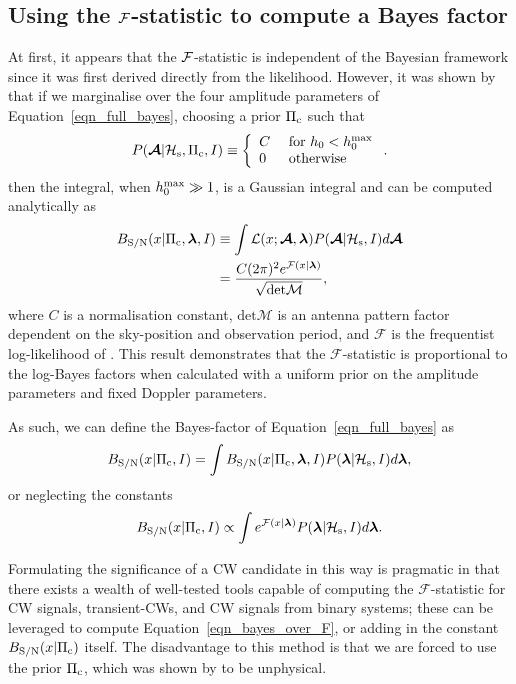\documentclass[aps, prd, twocolumn, superscriptaddress, floatfix, showpacs, nofootinbib, longbibliography]{revtex4-1}
\begin{document}
\subsection{Using the ${\mathcal{F}}$-statistic to compute a Bayes factor} At first, it
appears that the ${\mathcal{F}}$-statistic is independent of the Bayesian framework since
it was first derived directly from the likelihood. However, it was shown by
\citet{prix2009} that if we marginalise over the four amplitude parameters of
Equation~\eqref{eqn_full_bayes}, choosing a prior $\Pi_{\rm c}$ such that
\begin{equation}
P(\boldsymbol{\mathcal{A}}| \mathcal{H}_{\rm s}, \Pi_{\rm c}, I) \equiv \left\{
\begin{array}{ll}
C & \textrm{ for } h_0 < h_0^{\rm max} \\
0 & \textrm{ otherwise}
\end{array}
\right..
\end{equation}
then the integral, when $h_0^{\rm max} \gg 1$, is a Gaussian integral and can be
computed analytically as
\begin{align}
B_{\rm S/N}(x| \Pi_{\rm c}, \boldsymbol{\mathbf{\lambda}}, I) & \equiv
\int
\mathcal{L}(x ;\boldsymbol{\mathcal{A}}, \boldsymbol{\mathbf{\lambda}})
P(\boldsymbol{\mathcal{A}}| \mathcal{H}_{\rm s}, I) d\boldsymbol{\mathcal{A}}
\\
& = \frac{C (2\pi)^{2} e^{{\mathcal{F}}(x| \boldsymbol{\mathbf{\lambda}})}}
{\sqrt{\textrm{det} \mathcal{M}}},
\end{align}
where $C$ is a normalisation constant, $\textrm{det}\mathcal{M}$ is an antenna
pattern factor dependent on the sky-position and observation period, and
$\mathcal{F}$ is the frequentist log-likelihood of \citet{jks1998}. This result
demonstrates that the $\mathcal{F}$-statistic is proportional to the log-Bayes
factors when calculated with a uniform prior on the amplitude parameters and
fixed Doppler parameters.

As such, we can define the Bayes-factor of Equation~\eqref{eqn_full_bayes} as
\begin{equation}
B_{\rm S/N}(x| \Pi_{\rm c}, I) = \int
B_{\rm S/N}(x| \Pi_{\rm c}, \boldsymbol{\mathbf{\lambda}}, I) P(\boldsymbol{\mathbf{\lambda}}| \mathcal{H}_{\rm s}, I)
 d\boldsymbol{\mathbf{\lambda}},
\end{equation}
or neglecting the constants
\begin{equation}
B_{\rm S/N}(x| \Pi_{\rm c}, I) \propto \int
e^{{\mathcal{F}}(x| \boldsymbol{\mathbf{\lambda}})} P(\boldsymbol{\mathbf{\lambda}}| \mathcal{H}_{\rm s}, I)
 d\boldsymbol{\mathbf{\lambda}}.
\label{eqn_bayes_over_F}
\end{equation}

Formulating the significance of a CW candidate in this way is pragmatic in that
there exists a wealth of well-tested tools \citep{lalsuite} capable of
computing the $\mathcal{F}$-statistic for CW signals, transient-CWs, and CW
signals from binary systems; these can be leveraged to compute
Equation~\eqref{eqn_bayes_over_F}, or adding in the constant
$B_{\rm S/N}(x| \Pi_{\rm c})$ itself. The disadvantage to this method is that
we are forced to use the prior $\Pi_{\rm c}$, which was shown by \citet{prix2009} to
be unphysical.
\end{document}
